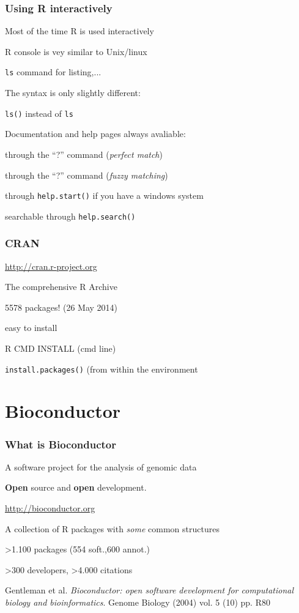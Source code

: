 \documentclass[xcolor=dvipsnames]{beamer}
\begin{document}
        \begin{frame}
     \frametitle{Using R interactively}
      \bit
      \item Most of the time R is used interactively
	  \item R console is vey similar to Unix/linux
	    \bit
		\item \texttt{ls} command for listing,...
		\item The syntax is only slightly different:
		  \bit
		      \item \texttt{ls()} instead of \texttt{ls}
		  \eit
	    \eit
	   \item Documentation and help pages always avaliable:
	    \bit
		\item through the ``?'' command (\emph{perfect match})
		\item through the ``?'' command (\emph{fuzzy matching})
		\item through \texttt{help.start()} if you have a windows system
		\item searchable through \texttt{help.search()}
	    \eit
	  
      \eit
     \end{frame}

          \begin{frame}
     \frametitle{CRAN}
      \bit
          \item \url{http://cran.r-project.org}
	  \item The comprehensive R Archive
	    \bit
		\item 5578 packages! (26 May 2014)
		\item easy to install
		  \bit
		      \item R CMD INSTALL (cmd line)
		      \item \texttt{install.packages()} (from within the environment
		  \eit
	    \eit
      \eit
     \end{frame}
     
     
  \section{Bioconductor}

 \begin{frame}
     \frametitle{What is Bioconductor}
    \bit
    \item A software project for the analysis of genomic data
    \item \textbf{Open} source and \textbf{open} development.
    \item \url{http://bioconductor.org}
    \item A collection of R packages with \emph{some} common structures
	    \bit
		\item >1.100 packages (554 soft.,600 annot.)
		\item >300 developers, >4.000 citations
	    \eit
    \item Gentleman et al. \emph{Bioconductor: open software development for computational biology and bioinformatics}. Genome Biology (2004) vol. 5 (10) pp. R80
      \eit
     \end{frame}
 
\end{document}
